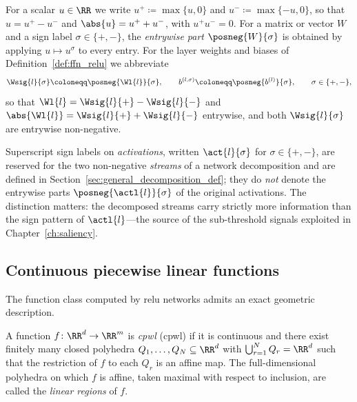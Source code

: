 \begin{definition}\label{def:posneg_parts}
For a scalar $u \in \RR$ we write $u^{+} \coloneqq \max\{u, 0\}$ and $u^{-} \coloneqq \max\{-u, 0\}$, so that $u = u^{+} - u^{-}$ and $\abs{u} = u^{+} + u^{-}$, with $u^+ u^- = 0$. For a matrix or vector $W$ and a sign label $\sigma \in \{+,-\}$, the \emph{entrywise part} $\posneg{W}{\sigma}$ is obtained by applying $u \mapsto u^{\sigma}$ to every entry. For the layer weights and biases of Definition~\ref{def:ffn_relu} we abbreviate
\begin{equation}
	\Wsig{l}{\sigma} \coloneqq \posneg{\Wl{l}}{\sigma},
	\qquad
	b^{(l,\sigma)} \coloneqq \posneg{b^{(l)}}{\sigma},
	\qquad \sigma \in \{+,-\},
	\label{eq:weight_split}
\end{equation}
so that $\Wl{l} = \Wsig{l}{+} - \Wsig{l}{-}$ and $\abs{\Wl{l}} = \Wsig{l}{+} + \Wsig{l}{-}$ entrywise, and both $\Wsig{l}{\sigma}$ are entrywise non-negative.
\end{definition}

\begin{remark}\label{rem:pair_notation}
Superscript sign labels on \emph{activations}, written $\act{l}{\sigma}$ for $\sigma \in \{+,-\}$, are reserved for the two non-negative \emph{streams} of a network decomposition and are defined in Section~\ref{sec:general_decomposition_def}; they do \emph{not} denote the entrywise parts $\posneg{\actl{l}}{\sigma}$ of the original activations. The distinction matters: the decomposed streams carry strictly more information than the sign pattern of $\actl{l}$---the source of the sub-threshold signals exploited in Chapter~\ref{ch:saliency}.
\end{remark}

\subsection*{Continuous piecewise linear functions}

The function class computed by \ac{relu} networks admits an exact geometric description.

\begin{definition}\label{def:cpwl}
A function $f \colon \RR^{d} \to \RR^{m}$ is \emph{\acl{cpwl}} (\acs{cpwl}) if it is continuous and there exist finitely many closed polyhedra $Q_1, \ldots, Q_N \subseteq \RR^d$ with $\bigcup_{r=1}^{N} Q_r = \RR^d$ such that the restriction of $f$ to each $Q_r$ is an affine map. The full-dimensional polyhedra on which $f$ is affine, taken maximal with respect to inclusion, are called the \emph{linear regions} of $f$.
\end{definition}

